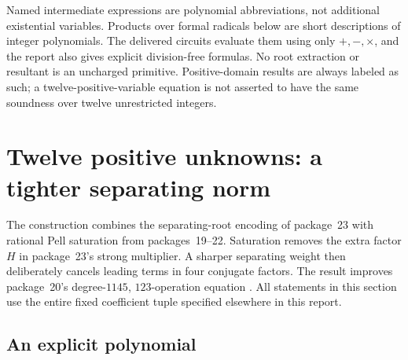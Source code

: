 \documentclass[11pt,letterpaper]{article}
\theoremstyle{remark}
\begin{document}
Named intermediate expressions are polynomial abbreviations, not
additional existential variables.  Products over formal radicals below
are short descriptions of integer polynomials.  The delivered circuits
evaluate them using only $+,-,\times$, and the report also gives explicit
division-free formulas.  No root extraction or resultant is an uncharged
primitive.  Positive-domain results are always labeled as such; a
twelve-positive-variable equation is not asserted to have the same
soundness over twelve unrestricted integers.



\section{Twelve positive unknowns: a tighter separating norm}
\label{sec:positive}

The construction combines the separating-root encoding of package~23 with
rational Pell saturation from packages~19--22. Saturation removes the extra
factor $H$ in package~23's strong multiplier. A sharper separating weight
then deliberately cancels leading terms in four conjugate factors. The
result improves package~20's degree-$1145$, $123$-operation equation
\cite{repo19,repo20,repo21,repo23}. All statements in this section use the
entire fixed coefficient tuple specified elsewhere in this report.

\subsection{An explicit polynomial}
\end{document}

